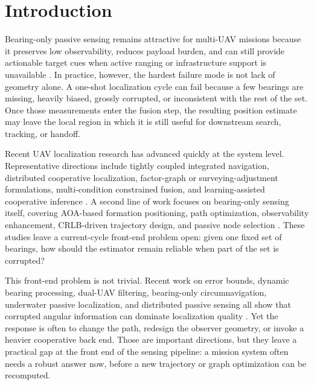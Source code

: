 \documentclass[drones,article,submit,pdftex,moreauthors]{Definitions/mdpi}
\begin{document}
\section{Introduction}

Bearing-only passive sensing remains attractive for multi-UAV missions because it preserves low observability, reduces payload burden, and can still provide actionable target cues when active ranging or infrastructure support is unavailable \cite{avola2024uav,liu2025survey,kramaric2025comprehensive,gao2023scalable,li2025bearing}. In practice, however, the hardest failure mode is not lack of geometry alone. A one-shot localization cycle can fail because a few bearings are missing, heavily biased, grossly corrupted, or inconsistent with the rest of the set. Once those measurements enter the fusion step, the resulting position estimate may leave the local region in which it is still useful for downstream search, tracking, or handoff.

Recent UAV localization research has advanced quickly at the system level. Representative directions include tightly coupled integrated navigation, distributed cooperative localization, factor-graph or surveying-adjustment formulations, multi-condition constrained fusion, and learning-assisted cooperative inference \cite{yang2020tightly,dai2022uav,yang2024distributed,qian2025cooperative,li2025tcdrl,li2026formation,liu2026high,ding2026set,jia2024composite}. A second line of work focuses on bearing-only sensing itself, covering AOA-based formation positioning, path optimization, observability enhancement, CRLB-driven trajectory design, and passive node selection \cite{kang2024aoa,huang2025emcompat,xing2025node,zou2024revisit,chen2025variable,wang2025bio,dogancay2024bayesian}. These studies leave a current-cycle front-end problem open: given one fixed set of bearings, how should the estimator remain reliable when part of the set is corrupted?

This front-end problem is not trivial. Recent work on error bounds, dynamic bearing processing, dual-UAV filtering, bearing-only circumnavigation, underwater passive localization, and distributed passive sensing all show that corrupted angular information can dominate localization quality \cite{chen2025error,luo2025dynamicbearing,yin2025dual,dou2025moving,mei2024bearing,zong2025distributed,yu2025passive,wu2026bearing,zhou2026direct,liu2026sensing}. Yet the response is often to change the path, redesign the observer geometry, or invoke a heavier cooperative back end. Those are important directions, but they leave a practical gap at the front end of the sensing pipeline: a mission system often needs a robust answer now, before a new trajectory or graph optimization can be recomputed.
\end{document}
